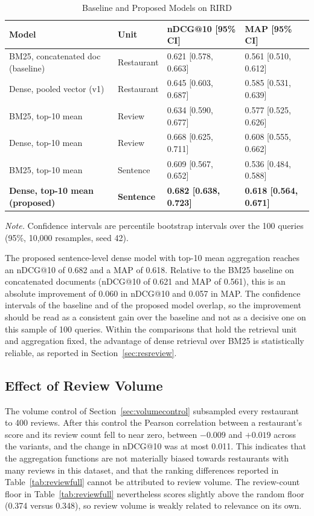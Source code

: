 \begin{table}[htbp]
\centering
\caption{Baseline and Proposed Models on RIRD}
\label{tab:headline}
\small
\begin{tabular}{|p{}|p{}|p{}|p{}|}
\hline
\textbf{Model} & \textbf{Unit} & \textbf{nDCG@10 [95\% CI]} & \textbf{MAP [95\% CI]} \\
\hline
BM25, concatenated doc (baseline) & Restaurant & 0.621 [0.578, 0.663] & 0.561 [0.510, 0.612] \\
\hline
Dense, pooled vector (v1) & Restaurant & 0.645 [0.603, 0.687] & 0.585 [0.531, 0.639] \\
\hline
BM25, top-10 mean & Review & 0.634 [0.590, 0.677] & 0.577 [0.525, 0.626] \\
\hline
Dense, top-10 mean & Review & 0.668 [0.625, 0.711] & 0.608 [0.555, 0.662] \\
\hline
BM25, top-10 mean & Sentence & 0.609 [0.567, 0.652] & 0.536 [0.484, 0.588] \\
\hline
\textbf{Dense, top-10 mean (proposed)} & \textbf{Sentence} & \textbf{0.682 [0.638, 0.723]} & \textbf{0.618 [0.564, 0.671]} \\
\hline
\end{tabular}

\vspace{2pt}
\footnotesize\textit{Note.} Confidence intervals are percentile bootstrap intervals over the 100 queries (95\%, 10,000 resamples, seed 42).
\end{table}

The proposed sentence-level dense model with top-10 mean aggregation reaches an nDCG@10 of 0.682 and a MAP of 0.618. Relative to the BM25 baseline on concatenated documents (nDCG@10 of 0.621 and MAP of 0.561), this is an absolute improvement of 0.060 in nDCG@10 and 0.057 in MAP. The confidence intervals of the baseline and of the proposed model overlap, so the improvement should be read as a consistent gain over the baseline and not as a decisive one on this sample of 100 queries. Within the comparisons that hold the retrieval unit and aggregation fixed, the advantage of dense retrieval over BM25 is statistically reliable, as reported in Section~\ref{sec:resreview}.

\subsection{Effect of Review Volume}
\label{sec:resvolume}

The volume control of Section~\ref{sec:volumecontrol} subsampled every restaurant to 400 reviews. After this control the Pearson correlation between a restaurant's score and its review count fell to near zero, between $-0.009$ and $+0.019$ across the variants, and the change in nDCG@10 was at most 0.011. This indicates that the aggregation functions are not materially biased towards restaurants with many reviews in this dataset, and that the ranking differences reported in Table~\ref{tab:reviewfull} cannot be attributed to review volume. The review-count floor in Table~\ref{tab:reviewfull} nevertheless scores slightly above the random floor (0.374 versus 0.348), so review volume is weakly related to relevance on its own.

